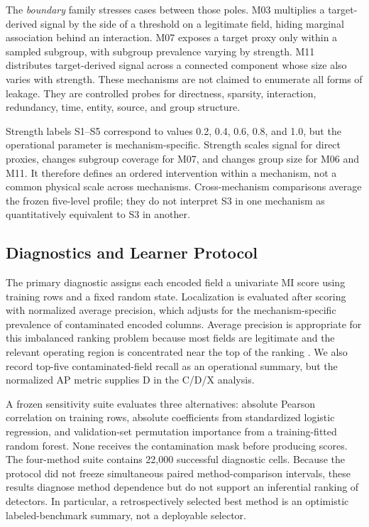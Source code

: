 \documentclass[sigconf,review]{acmart}
\begin{document}
The \emph{boundary} family stresses cases between those poles. M03 multiplies
a target-derived signal by the side of a threshold on a legitimate field,
hiding marginal association behind an interaction. M07 exposes a target proxy
only within a sampled subgroup, with subgroup prevalence varying by strength.
M11 distributes target-derived signal across a connected component whose size
also varies with strength. These mechanisms are not claimed to enumerate all
forms of leakage. They are controlled probes for directness, sparsity,
interaction, redundancy, time, entity, source, and group structure.

Strength labels S1--S5 correspond to values 0.2, 0.4, 0.6, 0.8, and 1.0, but
the operational parameter is mechanism-specific. Strength scales signal for
direct proxies, changes subgroup coverage for M07, and changes group size for
M06 and M11. It therefore defines an ordered intervention within a mechanism,
not a common physical scale across mechanisms. Cross-mechanism comparisons
average the frozen five-level profile; they do not interpret S3 in one
mechanism as quantitatively equivalent to S3 in another.

\subsection{Diagnostics and Learner Protocol}

The primary diagnostic assigns each encoded field a univariate MI score using
training rows and a fixed random state. Localization is evaluated after scoring
with normalized average precision, which adjusts for the mechanism-specific
prevalence of contaminated encoded columns. Average precision is appropriate
for this imbalanced ranking problem because most fields are legitimate and the
relevant operating region is concentrated near the top of the ranking
\cite{saito2015precision}. We also record top-five contaminated-field recall as
an operational summary, but the normalized AP metric supplies D in the C/D/X
analysis.

A frozen sensitivity suite evaluates three alternatives: absolute Pearson
correlation on training rows, absolute coefficients from standardized logistic
regression, and validation-set permutation importance from a training-fitted
random forest. None receives the contamination mask before producing scores.
The four-method suite contains 22,000 successful diagnostic cells. Because the
protocol did not freeze simultaneous paired method-comparison intervals, these
results diagnose method dependence but do not support an inferential ranking of
detectors. In particular, a retrospectively selected best method is an
optimistic labeled-benchmark summary, not a deployable selector.
\end{document}
